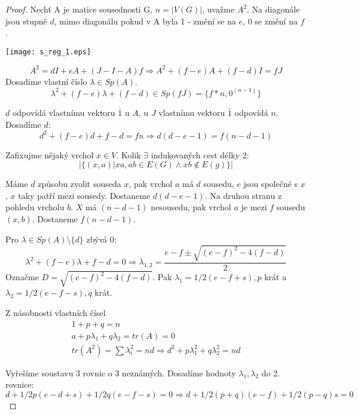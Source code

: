 \begin{proof}
	Nechť A je matice sousednosti G, $n = |V(G)|$, uvažme $A^2$.
	Na diagonále jsou stupně $d$, mimo diagonálu pokud v A byla 1 - změní se na $e$, 0 se změní na $f$.

	\texttt{[image: s\_reg\_1.eps]}

	\[ A^2 = dI + eA + (J -I - A)f \Rightarrow A^2 + (f - e)A + (f - d)I = fJ \]
	Dosadíme vlastní číslo $\lambda \in Sp(A)$.
	\[ \lambda^2 + (f - e)\lambda + (f - d) \in Sp(fJ) = \{ f * n, 0^{(n-1)} \} \]

	$d$ odpovídá vlastnímu vektoru $\bar{1}$ u $A$, u $J$ vlastnímu vektoru $\bar{1}$ odpovídá $n$. Dosadíme $d$:
	\[ d^2 + (f - e)d + f - d = fn \Rightarrow d(d - e - 1) = f(n - d - 1)\]

	Zafixujme nějaký vrchol $x \in V$. Kolik $\exists$ indukovaných cest délky 2:
	\[ |\{ (x,a) | xa, ab \in E(G) \land xb \notin E(g) \}| \]

	Máme $d$ způsobu zvolit souseda $x$, pak vrchol $a$ má $d$ sousedu, $e$ jsou společné s $x$, $x$ taky patří mezi sousedy. Dostaneme $d (d - e - 1)$.
	Na druhou stranu z pohledu vrcholu $b$. $X$ má $(n - d - 1)$ nesousedu, pak vrchol $a$ je mezi $f$ sousedu $(x,b)$. Dostaneme $f(n - d - 1)$.

	Pro $\lambda \in Sp(A)\setminus \{d\}$ zbývá 0:
	\[ \lambda^2 + (f - e)\lambda + f - d = 0 \Rightarrow \lambda_{1,2} = \frac{e - f \pm \sqrt{(e - f)^2 - 4 (f - d)}}{2} \]
	Označme $D = \sqrt{(e - f)^2 - 4 (f - d)}$. Pak $\lambda_1 = 1/2 (e - f + s), p$ krát a $\lambda_2 = 1/2 (e - f - s), q$ krát.

	Z násobnosti vlastních čísel
	\begin{equation*}
	\begin{aligned}
	 1 + p + q = n \\
	 a + p\lambda_1 + q \lambda_2 = tr(A) = 0 \\
	 tr(A^2) = \sum \lambda_i^2 = nd \Rightarrow d^2 + p \lambda_1^2 + q \lambda_2^2 = nd
	\end{aligned}
	\end{equation*}

	Vyřešíme soustavu 3 rovnic o 3 neznámých.
	Dosadíme hodnoty $\lambda_1, \lambda_2$ do 2. rovnice:
	\[ d + 1/2 p (e - d + s) + 1/2 q (e - f - s) = 0 \Rightarrow d + 1/2(p + q) (e - f) + 1/2 (p - q) s = 0 \]


\end{proof}
